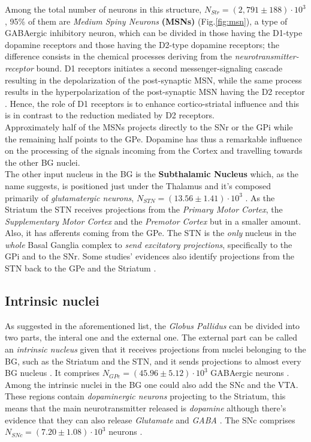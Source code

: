 \documentclass[MSc,english]{Container/thesistemplate}
\begin{document}
Among the total number of neurons in this structure, $N_{Str}=(2,791\pm 188)\cdot 10^3$ \cite{oorschot}, 95\% of them are \emph{Medium Spiny Neurons} \textbf{(MSNs)} (Fig.\ref{fig:msn}), a type of GABAergic inhibitory neuron, which can be divided in those having the D1-type dopamine receptors and those having the D2-type dopamine receptors; the difference consists in the chemical processes deriving from the \emph{neurotransmitter-receptor} bound. D1 receptors initiates a second messenger-signaling cascade resulting in the depolarization of the post-synaptic MSN, while the same process results in the hyperpolarization of the post-synaptic MSN having the D2 receptor \cite{utterbasso}. Hence, the role of D1 receptors is to enhance cortico-striatal influence and this is in contrast to the reduction mediated by D2 receptors.
\\ Approximately half of the MSNs projects directly to the SNr or the GPi while the remaining half points to the GPe. Dopamine has thus a remarkable influence on the processing of the signals incoming from the Cortex and travelling towards the other BG nuclei.
\\ The other input nucleus in the BG is the \textbf{Subthalamic Nucleus} which, as the name suggests, is positioned just under the Thalamus and it's composed primarily of \emph{glutamatergic neurons}, $N_{STN} = (13.56\pm 1.41)\cdot 10^3$ \cite{oorschot}. As the Striatum the STN receives projections from the \emph{Primary Motor Cortex}, the \emph{Supplementary Motor Cortex} and the \emph{Premotor Cortex} but in a smaller amount. Also, it has afferents coming from the GPe. The STN is the \emph{only} nucleus in the \emph{whole} Basal Ganglia complex to \emph{send excitatory projections}, specifically to the GPi and to the SNr. Some studies' evidences also identify projections from the STN back to the GPe and the Striatum \cite{nelsonkreitzer}.

\subsection*{Intrinsic nuclei}
As suggested in the aforementioned list, the \emph{Globus Pallidus} can be divided into two parts, the interal one and the external one. The external part can be called an \emph{intrinsic nucleus} given that it receives projections from nuclei belonging to the BG, such as the Striatum and the STN, and it sends projections to almost every BG nucleus \cite{nelsonkreitzer}. It comprises $N_{GPe} = (45.96 \pm 5.12)\cdot 10^3$ GABAergic neurons \cite{oorschot}. Among the intrinsic nuclei in the BG one could also add the SNc and the VTA. These regions contain \emph{dopaminergic neurons} projecting to the Striatum, this means that the main neurotransmitter released is \emph{dopamine} although there's evidence that they can also release \emph{Glutamate} and \emph{GABA} \cite{nelsonkreitzer}. The SNc comprises $N_{SNc} = (7.20\pm 1.08)\cdot 10^3$ neurons \cite{oorschot}.
\end{document}
